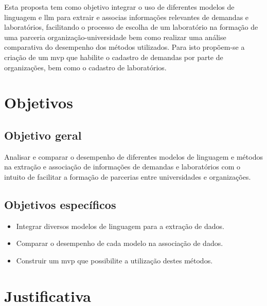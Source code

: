 Esta proposta tem como objetivo integrar o uso de diferentes modelos de linguagem e \gls{llm} para extrair e associas informações relevantes de demandas e laboratórios, facilitando o processo de escolha de um laboratório na formação de uma parceria organização-universidade bem como realizar uma análise comparativa do desempenho dos métodos utilizados. Para isto propõem-se a criação de um \gls{mvp} que habilite o cadastro de demandas por parte de organizações, bem como o cadastro de laboratórios.

\section{Objetivos}\label{sec:objetivos}

\subsection{Objetivo geral}\label{subsec:objetivoGeral}

Analisar e comparar o desempenho de diferentes modelos de linguagem e métodos na extração e associação de informações de demandas e laboratórios com o intuito de facilitar a formação de parcerias entre universidades e organizações.

\subsection{Objetivos específicos}\label{subsec:objetivosEspecificos}

\begin{itemize}
    \item Integrar diversos modelos de linguagem para a extração de dados.
    \item Comparar o desempenho de cada modelo na associação de dados.
    \item Construir um \gls{mvp} que possibilite a utilização destes métodos.
\end{itemize}

\section{Justificativa}\label{sec:justificativa}

